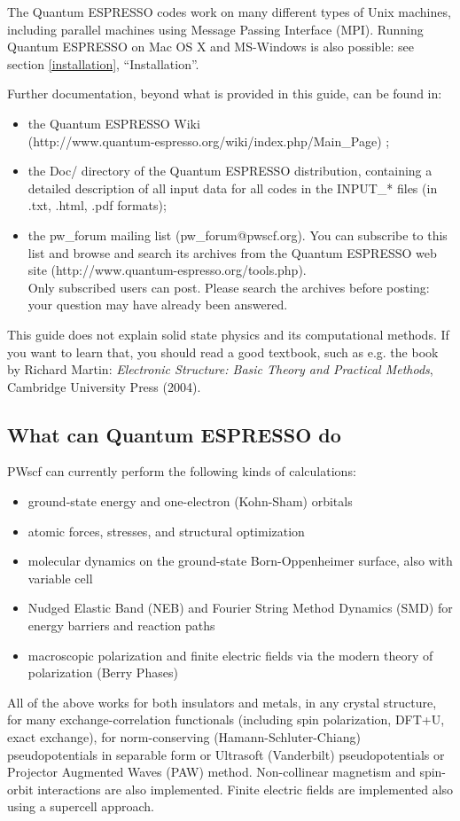 \documentclass[12pt,a4paper]{article}
\begin{document}
The Quantum ESPRESSO codes work on many different types of 
Unix machines,
including parallel machines using Message Passing Interface (MPI).
Running Quantum ESPRESSO on Mac OS X and MS-Windows is also possible: 
see section \ref{installation}, ``Installation''.

Further documentation, beyond what is provided in this guide, can be found in:
\begin{itemize}
  \item the Quantum ESPRESSO Wiki\\
   (http://www.quantum-espresso.org/wiki/index.php/Main\_Page) ;
  \item the Doc/ directory of the Quantum ESPRESSO distribution,
   containing a detailed description of all input data for all codes
   in the INPUT\_* files (in .txt, .html, .pdf formats);
\item the pw\_forum mailing list (pw\_forum@pwscf.org).
   You can subscribe to this list and browse and search its archives 
   from the Quantum ESPRESSO web site 
   (http://www.quantum-espresso.org/tools.php).\\
   Only subscribed users can post. Please search the archives 
   before posting: your question may have already been answered.
\end{itemize}

This guide does not explain solid state physics and its computational methods.
If you want to learn that, you should read a good textbook, such as e.g.
the book by Richard Martin:
{\em Electronic Structure: Basic Theory and Practical Methods},
Cambridge University Press (2004).

\subsection{What can Quantum ESPRESSO do}

PWscf can currently perform the following kinds of calculations:
\begin{itemize}
  \item ground-state energy and one-electron (Kohn-Sham) orbitals
  \item atomic forces, stresses, and structural optimization
  \item molecular dynamics on the ground-state Born-Oppenheimer surface, 
   also with variable cell
  \item Nudged Elastic Band (NEB) and Fourier String Method Dynamics (SMD)
  for energy barriers and reaction paths
  \item macroscopic polarization and finite electric fields via 
  the modern theory of polarization (Berry Phases)
\end{itemize}
All of the above works for both insulators and metals, 
in any crystal structure, for many exchange-correlation functionals
(including spin polarization, DFT+U, exact exchange), for
norm-conserving (Hamann-Schluter-Chiang) pseudopotentials in 
separable form or Ultrasoft (Vanderbilt) pseudopotentials 
or Projector Augmented Waves (PAW) method.
Non-collinear magnetism and spin-orbit interactions 
are also implemented.  
Finite electric fields are implemented also using a supercell approach.
\end{document}
